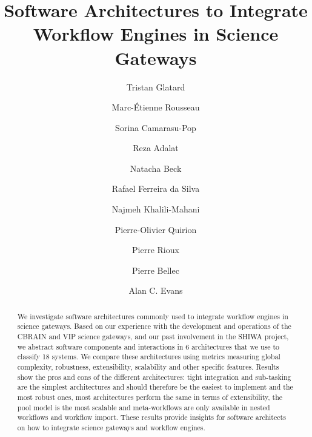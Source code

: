 \documentclass[preprint,3p,twocolumn]{elsarticle}
\begin{document}
\begin{frontmatter}



\title{Software Architectures to Integrate Workflow Engines in Science Gateways}


\author[mcgill,creatis]{Tristan Glatard}
\author[mcgill]{Marc-\'Etienne Rousseau}
\author[creatis]{Sorina Camarasu-Pop}

\author[mcgill]{Reza Adalat}
\author[mcgill]{Natacha Beck}
\author[isi]{Rafael Ferreira da Silva}
\author[mcgill]{Najmeh Khalili-Mahani}
\author[criugm]{Pierre-Olivier Quirion}
\author[mcgill]{Pierre Rioux}

\author[criugm]{Pierre Bellec}
\author[mcgill]{Alan C. Evans}

\address[mcgill]{McGill Centre for Integrative Neuroscience, Montreal Neurological Institute, McGill University, Canada.}
\address[creatis]{University of Lyon, CNRS, INSERM, CREATIS, Villeurbanne, France.}
\address[criugm]{Centre de Recherche de l'Institut de G\'eriatrie de Montr\'eal CRIUGM, Montreal, QC, Canada.}
\address[isi]{University of Southern California, Information Sciences Institute, Marina del Rey, CA, USA.}

\begin{abstract}
  We investigate software architectures commonly used to integrate
  workflow engines in science gateways. Based on our experience with
  the development and operations of the CBRAIN and VIP science
  gateways, and our past involvement in the SHIWA project, we abstract
  software components and interactions in 6 architectures that we use
  to classify 18 systems. We compare these architectures using metrics
  measuring global complexity, robustness, extensibility, scalability
  and other specific features. Results show the pros and cons of the
  different architectures: tight integration and sub-tasking are the
  simplest architectures and should therefore be the easiest to
  implement and the most robust ones, most architectures perform the
  same in terms of extensibility, the pool model is the most scalable
  and meta-workflows are only available in nested workflows and
  workflow import. These results provide insights for software
  architects on how to integrate science gateways and workflow
  engines.
\end{abstract}


\end{frontmatter}
\end{document}
